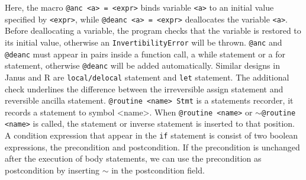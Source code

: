\documentclass[aps,twocolumn,longbibliography,english,superscriptaddress,prr]{revtex4-1}
\newcommand{\<}{\langle}
\renewcommand{\>}{\rangle}
\theoremstyle{definition}\newtheorem{definition}{\textit{Definition}}
\begin{document}
    Here, the macro \texttt{@anc <a> = <expr>} binds variable \texttt{<a>} to an initial value specified by \texttt{<expr>}, while \texttt{@deanc <a> = <expr>} deallocates the variable \texttt{<a>}. Before deallocating a variable, the program checks that the variable is restored to its initial value, otherwise an \texttt{InvertibilityError} will be thrown. \texttt{@anc} and \texttt{@deanc} must appear in pairs inside a function call, a while statement or a for statement, otherwise \texttt{@deanc} will be added automatically. Similar designs in Janus and R are \texttt{local/delocal} statement and \texttt{let} statement. The additional check underlines the difference between the irreversible assign statement and reversible ancilla statement.
    \texttt{@routine <name> Stmt} is a statements recorder, it records a statement to symbol <name>. When \texttt{@routine <name>} or \texttt{$\sim$@routine <name>} is called, the statement or inverse statement is inserted to that position.
    A condition expression that appear in the \texttt{if} statement is consist of two boolean expressions, the precondition and postcondition. If the precondition is unchanged after the execution of body statements, we can use the precondition as postcondition by inserting \texttt{$\sim$} in the postcondition field.
    
\end{document}
